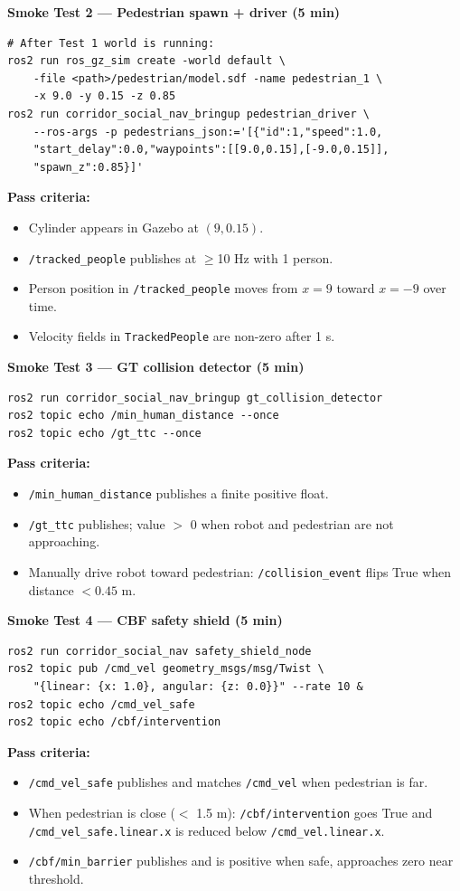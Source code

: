 \documentclass[11pt]{article}
\begin{document}
\begin{enumerate}
    \textbf{Smoke Test 2 --- Pedestrian spawn + driver (5 min)}
    \begin{verbatim}
# After Test 1 world is running:
ros2 run ros_gz_sim create -world default \
    -file <path>/pedestrian/model.sdf -name pedestrian_1 \
    -x 9.0 -y 0.15 -z 0.85
ros2 run corridor_social_nav_bringup pedestrian_driver \
    --ros-args -p pedestrians_json:='[{"id":1,"speed":1.0,
    "start_delay":0.0,"waypoints":[[9.0,0.15],[-9.0,0.15]],
    "spawn_z":0.85}]'
    \end{verbatim}
    \textbf{Pass criteria:}
    \begin{itemize}
      \item Cylinder appears in Gazebo at $(9, 0.15)$.
      \item \texttt{/tracked\_people} publishes at $\geq$10 Hz with 1 person.
      \item Person position in \texttt{/tracked\_people} moves from $x{=}9$ toward $x{=}{-9}$ over time.
      \item Velocity fields in \texttt{TrackedPeople} are non-zero after 1 s.
    \end{itemize}

    \textbf{Smoke Test 3 --- GT collision detector (5 min)}
    \begin{verbatim}
ros2 run corridor_social_nav_bringup gt_collision_detector
ros2 topic echo /min_human_distance --once
ros2 topic echo /gt_ttc --once
    \end{verbatim}
    \textbf{Pass criteria:}
    \begin{itemize}
      \item \texttt{/min\_human\_distance} publishes a finite positive float.
      \item \texttt{/gt\_ttc} publishes; value $>$ 0 when robot and pedestrian are not approaching.
      \item Manually drive robot toward pedestrian: \texttt{/collision\_event} flips True when
        distance $< 0.45$ m.
    \end{itemize}

    \textbf{Smoke Test 4 --- CBF safety shield (5 min)}
    \begin{verbatim}
ros2 run corridor_social_nav safety_shield_node
ros2 topic pub /cmd_vel geometry_msgs/msg/Twist \
    "{linear: {x: 1.0}, angular: {z: 0.0}}" --rate 10 &
ros2 topic echo /cmd_vel_safe
ros2 topic echo /cbf/intervention
    \end{verbatim}
    \textbf{Pass criteria:}
    \begin{itemize}
      \item \texttt{/cmd\_vel\_safe} publishes and matches \texttt{/cmd\_vel} when pedestrian is far.
      \item When pedestrian is close ($<$ 1.5 m): \texttt{/cbf/intervention} goes True and
        \texttt{/cmd\_vel\_safe.linear.x} is reduced below \texttt{/cmd\_vel.linear.x}.
      \item \texttt{/cbf/min\_barrier} publishes and is positive when safe, approaches zero near threshold.
    \end{itemize}


\end{enumerate}
\end{document}

